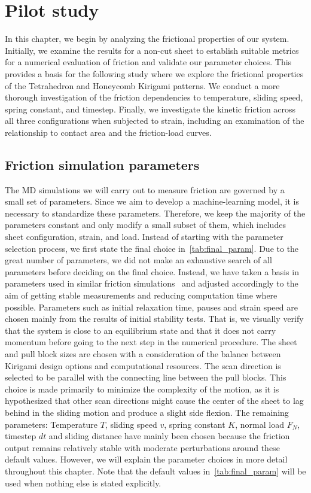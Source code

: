 \chapter{Pilot study}\label{chap:pilot_study}
In this chapter, we begin by analyzing the frictional properties of our system. Initially, we examine the results for a non-cut sheet to establish suitable metrics for a numerical evaluation of friction and validate our parameter choices. This provides a basis for the following study where we explore the frictional properties of the Tetrahedron and Honeycomb Kirigami patterns. We conduct a more thorough investigation of the friction dependencies to temperature, sliding speed, spring constant, and timestep. Finally, we investigate the kinetic friction across all three configurations when subjected to strain, including an examination of the relationship to contact area and the friction-load curves.


\section{Friction simulation parameters}
The \acrshort{MD} simulations we will carry out to measure friction are governed
by a small set of parameters. Since we aim to develop a machine-learning model,
it is necessary to standardize these parameters. Therefore, we keep the majority
of the parameters constant and only modify a small subset of them, which
includes sheet configuration, strain, and load. Instead of starting with the
parameter selection process, we first state the final choice
in~\cref{tab:final_param}. Due to the great number of parameters, we did not
make an exhaustive search of all parameters before deciding on the final choice.
Instead, we have taken a basis in parameters used in similar friction
simulations~\cite{li_evolving_2016, Yoon2015MolecularDS, liu_high-speed_2014,
zhu_study_2018, ma12091425} and adjusted accordingly to the aim of getting
stable measurements and reducing computation time where possible. Parameters
such as initial relaxation time, pauses and strain speed are chosen mainly from
the results of initial stability tests. That is, we visually verify that the
system is close to an equilibrium state and that it does not carry momentum
before going to the next step in the numerical procedure. The sheet and pull
block sizes are chosen with a consideration of the balance between Kirigami
design options and computational resources. The scan direction is selected to be
parallel with the connecting line between the pull blocks. This choice is made
primarily to minimize the complexity of the motion, as it is hypothesized that
other scan directions might cause the center of the sheet to lag behind in the sliding motion and
produce a slight side flexion. The remaining
parameters: Temperature $T$, sliding speed $v$, spring constant
$K$, normal load $F_N$, timestep $dt$ and sliding distance have mainly been chosen
because the friction output remains relatively stable with moderate
perturbations around these default values. However, we will explain the parameter choices in more detail throughout this chapter. Note that the default values in~\cref{tab:final_param}
will be used when nothing else is stated explicitly.

